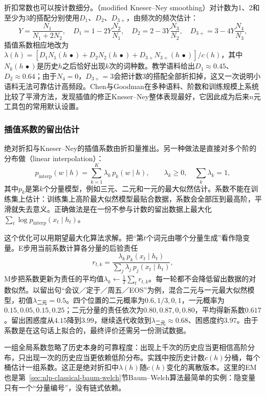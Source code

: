 折扣常数也可以按计数细分。（modified Kneser--Ney smoothing）对计数为1、2和至少为3的搭配分别使用$D_1$、$D_2$、$D_{3+}$，由频次的频次估计：
\[
  Y=\frac{N_1}{N_1+2N_2},\quad D_1=1-2Y\frac{N_2}{N_1},\quad D_2=2-3Y\frac{N_3}{N_2},\quad D_{3+}=3-4Y\frac{N_4}{N_3},
\]
插值系数相应地改为$\lambda(h)=[D_1N_1(h\,\bullet)+D_2N_2(h\,\bullet)+D_{3+}N_{3+}(h\,\bullet)]/c(h)$，其中$N_k(h\,\bullet)$是历史$h$之后恰好出现$k$次的词种数。教学语料给出$D_1\approx0.45$、$D_2\approx0.64$；由于$N_4=0$，$D_{3+}=3$会把计数3的搭配全部折扣掉，这又一次说明小语料无法可靠估计高频段。Chen与Goodman在多种语料、阶数和训练规模上系统比较了平滑方法，发现插值的修正Kneser--Ney整体表现最好，它因此成为后来$n$元工具包的常用默认设置。

\subsubsection{插值系数的留出估计}
\label{sec:nlp-classical-interpolation-em}

绝对折扣与Kneser--Ney的插值系数由折扣量推出。另一种做法是直接对多个阶的分布做（linear interpolation）：
\[
  p_{\mathrm{interp}}(w\mid h)=\sum_{k=1}^{K}\lambda_k\,p_k(w\mid h),\qquad \lambda_k\geq0,\quad\sum_k\lambda_k=1,
\]
其中$p_k$是第$k$个分量模型，例如三元、二元和一元的最大似然估计。系数不能在训练集上估计：训练集上高阶最大似然模型最贴合数据，系数会全部压到最高阶，平滑就失去意义。正确做法是在一份不参与计数的留出数据上最大化$\sum_t\log p_{\mathrm{interp}}(x_t\mid h_t)$。

这个优化可以用期望最大化算法求解。把“第$t$个词元由哪个分量生成”看作隐变量。E步用当前系数计算各分量的后验责任
\begin{equation}
  r_{t,k}=\frac{\lambda_k\,p_k(x_t\mid h_t)}{\sum_{j}\lambda_j\,p_j(x_t\mid h_t)},
  \label{eq:nlp-classical-interp-em}
\end{equation}
M步把系数更新为责任的平均值$\lambda_k\gets\frac1T\sum_t r_{t,k}$。每一轮都不会降低留出数据的对数似然。以留出句“会议／定于／周五／EOS”为例，混合二元与一元最大似然模型，初值$\lambda_{\text{二元}}=0.5$。四个位置的二元概率为$0.6,1/3,0,1$，一元概率为$0.15,0.05,0.15,0.25$；二元分量的责任依次为$0.80,0.87,0,0.80$，平均得新系数$0.617$。留出困惑度从$4.15$降到$3.99$，继续迭代收敛到$\lambda_{\text{二元}}\approx0.68$、困惑度约$3.97$。由于系数是在这句话上拟合的，最终评价还需另一份测试数据。

一组全局系数忽略了历史本身的可靠程度：出现上千次的历史应当更相信高阶分布，只出现一次的历史应当更依赖低阶分布。实践中按历史计数$c(h)$分桶，每个桶估计一组系数。这正是绝对折扣中$\lambda(h)$随$c(h)$变化的离散版本。这里的EM也是第~\ref{sec:nlp-classical-baum-welch}节Baum--Welch算法最简单的实例：隐变量只有一个“分量编号”，没有链式依赖。

